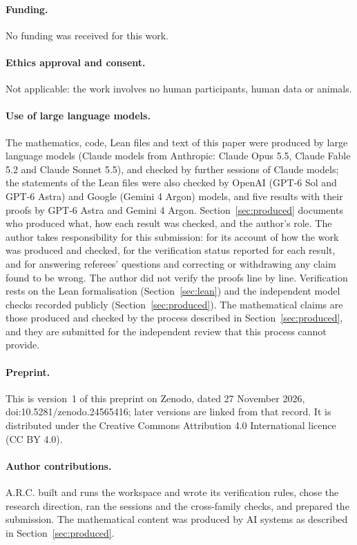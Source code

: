 \paragraph{Funding.} No funding was received for this work.

\paragraph{Ethics approval and consent.} Not applicable: the work involves no human participants, human data or animals.

\paragraph{Use of large language models.} The mathematics, code, Lean files and text of this paper were produced by large language models (Claude models from Anthropic: Claude Opus 5.5, Claude Fable 5.2 and Claude Sonnet 5.5), and checked by further sessions of Claude models; the statements of the Lean files were also checked by OpenAI (GPT-6 Sol and GPT-6 Astra) and Google (Gemini 4 Argon) models, and five results with their proofs by GPT-6 Astra and Gemini 4 Argon. Section~\ref{sec:produced} documents who produced what, how each result was checked, and the author's role. The author takes responsibility for this submission: for its account of how the work was produced and checked, for the verification status reported for each result, and for answering referees' questions and correcting or withdrawing any claim found to be wrong. The author did not verify the proofs line by line. Verification rests on the Lean formalisation (Section~\ref{sec:lean}) and the independent model checks recorded publicly (Section~\ref{sec:produced}). The mathematical claims are those produced and checked by the process described in Section~\ref{sec:produced}, and they are submitted for the independent review that this process cannot provide.

\paragraph{Preprint.} This is version~1 of this preprint on Zenodo, dated 27 November 2026, doi:10.5281/zenodo.24565416; later versions are linked from that record. It is distributed under the Creative Commons Attribution 4.0 International licence (CC BY 4.0).

\paragraph{Author contributions.} A.R.C. built and runs the workspace and wrote its verification rules, chose the research direction, ran the sessions and the cross-family checks, and prepared the submission. The mathematical content was produced by AI systems as described in Section~\ref{sec:produced}.

